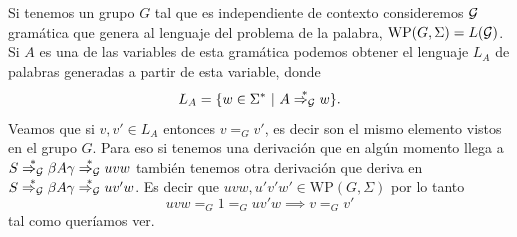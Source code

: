 \documentclass[tesis.tex]{subfiles}
\newcommand{\WP}{\text{WP}(G, \Sigma)}
\newcommand{\deriva}{\overset{*}{\Rightarrow_{\cal G}}}
\begin{document}
\begin{obs}\label{palabras-wp}
Si tenemos un grupo $G$ tal que es independiente de contexto consideremos $\cal G$ gramática que genera al lenguaje del problema de la palabra, $\WP = L(\cal G)$.
Si $A$ es una de las variables de esta gramática podemos obtener el lenguaje $L_A$ de palabras generadas a partir de esta variable, donde
\[
L_A = \{ w \in \Sigma^*  \ | \ A \deriva w  \}.
\]
Veamos que si $v,v' \in L_A$ entonces $v =_G v'$, es decir son el mismo elemento vistos en el grupo $G$. 
Para eso si tenemos una derivación que en algún momento llega a $S \deriva \beta A \gamma \deriva uvw$ también tenemos otra derivación que deriva en $S \deriva \beta A \gamma  \deriva uv'w$. 
Es decir que $uvw, u'v'w' \in \WP$ por lo tanto 
\begin{equation*}
	uvw =_G 1 =_G uv'w \implies v =_G v'
\end{equation*}
tal como queríamos ver.
\end{obs}
\end{document}
